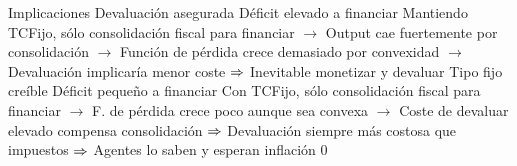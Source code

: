 \documentclass{nuevotema}
\begin{document}
\begin{esquemal}
		\2 Implicaciones
			\3 Devaluación asegurada
				\4 Déficit elevado a financiar
				\4[] Mantiendo TCFijo, sólo consolidación fiscal para financiar
				\4[] $\to$ Output cae fuertemente por consolidación
				\4[] $\to$ Función de pérdida crece demasiado por convexidad
				\4[] $\to$ Devaluación implicaría menor coste
				\4[] $\Rightarrow$ Inevitable monetizar y devaluar
			\3 Tipo fijo creíble
				\4 Déficit pequeño a financiar
				\4[] Con TCFijo, sólo consolidación fiscal para financiar
				\4[] $\to$ F. de pérdida crece poco aunque sea convexa
				\4[] $\to$ Coste de devaluar elevado compensa consolidación
				\4[] $\Rightarrow$ Devaluación siempre más costosa que impuestos
				\4[] $\Rightarrow$ Agentes lo saben y esperan inflación 0

\end{esquemal}
\end{document}

